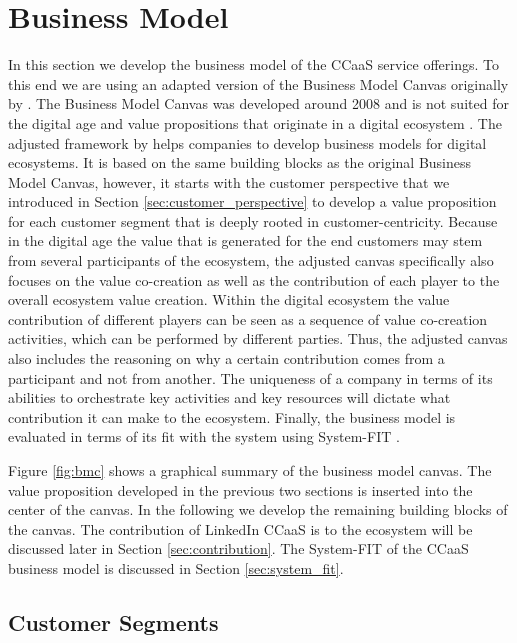 \section{Business Model}
\label{sec:business_model}

In this section we develop the business model of the CCaaS service offerings. To this end we are using an adapted
version of the Business Model Canvas originally by \citet{osterwalderBusinessModelGeneration2010}. The Business Model 
Canvas was developed around 2008 and is not suited for the digital age and value propositions that originate in a
digital ecosystem \citep[p.~193-210]{schwafertsLectureStrategicBusiness2023}. The adjusted framework by 
\citet{schwafertsLectureStrategicBusiness2023} helps companies to develop business models for digital ecosystems.
It is based on the same building blocks as the original Business Model Canvas, however, it starts with the customer 
perspective that we introduced in Section \ref{sec:customer_perspective} to develop a value proposition for each 
customer segment that is deeply rooted in customer-centricity. Because in the digital age the value that is generated for
the end customers may stem from several participants of the ecosystem, the adjusted canvas specifically also focuses on
the value co-creation as well as the contribution of each player to the overall ecosystem value creation. Within the digital
ecosystem the value contribution of different players can be seen as a sequence of value co-creation activities, which can 
be performed by different parties. Thus, the adjusted canvas also includes the reasoning on why a certain contribution 
comes from a participant and not from another. The uniqueness of a company in terms of its abilities to orchestrate 
key activities and key resources will dictate what contribution it can make to the ecosystem. Finally, the business 
model is evaluated in terms of its fit with the system using System-FIT \citet{schwafertsDigitalBusinessDevelopment2020}. 

Figure \ref{fig:bmc} shows a graphical summary of the business model canvas. The value proposition developed in
the previous two sections is inserted into the center of the canvas. In the following we develop the remaining
building blocks of the canvas. The contribution of LinkedIn CCaaS is to the ecosystem will be discussed later in
Section \ref{sec:contribution}. The System-FIT of the CCaaS business model is discussed in Section \ref{sec:system_fit}.

\subsection{Customer Segments}


